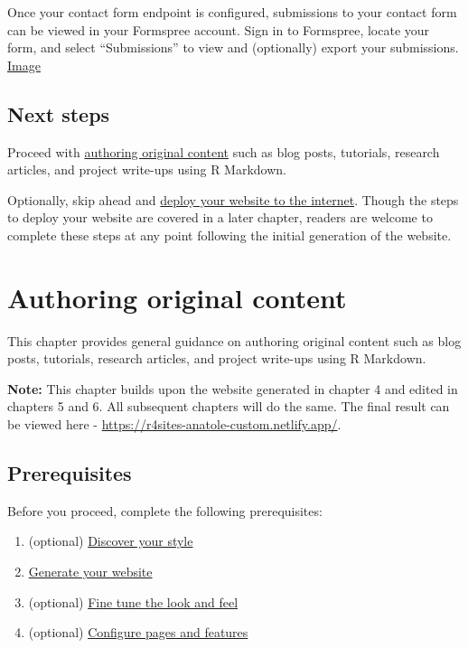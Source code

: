 \documentclass[
]{book}
\providecommand{\tightlist}{%
  \setlength{\itemsep}{0pt}\setlength{\parskip}{0pt}}
\begin{document}
Once your contact form endpoint is configured, submissions to your contact form can be viewed in your Formspree account. Sign in to Formspree, locate your form, and select ``Submissions'' to view and (optionally) export your submissions. \href{https://i.imgur.com/zua7Wuh.png}{Image}

\hypertarget{next-steps-4}{%
\section{Next steps}\label{next-steps-4}}

Proceed with \protect\hyperlink{content}{authoring original content} such as blog posts, tutorials, research articles, and project write-ups using R Markdown.

Optionally, skip ahead and \protect\hyperlink{deploy}{deploy your website to the internet}. Though the steps to deploy your website are covered in a later chapter, readers are welcome to complete these steps at any point following the initial generation of the website.

\hypertarget{content}{%
\chapter{Authoring original content}\label{content}}

This chapter provides general guidance on authoring original content such as blog posts, tutorials, research articles, and project write-ups using R Markdown.

\textbf{Note:} This chapter builds upon the website generated in chapter 4 and edited in chapters 5 and 6. All subsequent chapters will do the same. The final result can be viewed here - \url{https://r4sites-anatole-custom.netlify.app/}.

\hypertarget{prerequisites-3}{%
\section{Prerequisites}\label{prerequisites-3}}

Before you proceed, complete the following prerequisites:

\begin{enumerate}
\def\labelenumi{\arabic{enumi}.}
\tightlist
\item
  (optional) \protect\hyperlink{choose-theme}{Discover your style}
\item
  \protect\hyperlink{generate}{Generate your website}
\item
  (optional) \protect\hyperlink{fine-tune}{Fine tune the look and feel}
\item
  (optional) \protect\hyperlink{pages-features}{Configure pages and features}
\end{enumerate}
\end{document}
